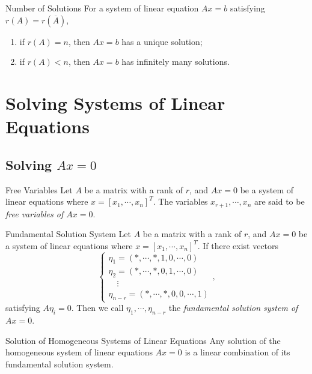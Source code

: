 \begin{proposition}{Number of Solutions}{}
  For a system of linear equation $Ax = b$ satisfying $r(A) = r(\overline{A})$,
  \begin{enumerate}
  \item if $r(A) = n$, then $Ax = b$ has a unique solution;
  \item if $r(A) < n$, then $Ax = b$ has infinitely many solutions.
  \end{enumerate}
\end{proposition}


\section{Solving Systems of Linear Equations}

\subsection{Solving $Ax = 0$}

\begin{definition}{Free Variables}{}
  Let $A$ be a matrix with a rank of $r$,
  and $Ax = 0$ be a system of linear equations where $x = [x_1,\cdots,x_n]^T$.
  The variables $x_{r+1},\cdots,x_n$ are said to be \emph{free variables of $Ax = 0$}.
\end{definition}

\begin{definition}{Fundamental Solution System}{}
  Let $A$ be a matrix with a rank of $r$,
  and $Ax = 0$ be a system of linear equations where $x = [x_1,\cdots,x_n]^T$.
  If there exist vectors
  \begin{equation}
    \begin{cases}
      \eta_1 = (*,\cdots,*,1,0,\cdots,0)\\
      \eta_2 = (*,\cdots,*,0,1,\cdots,0)\\
      \quad \vdots\\
      \eta_{n-r} = (*,\cdots,*,0,0,\cdots,1)
    \end{cases},
  \end{equation}
  satisfying $A\eta_i = 0$.
  Then we call $\eta_1,\cdots,\eta_{n-r}$ the \emph{fundamental solution system of
    $Ax = 0$}.
\end{definition}

\begin{proposition}{Solution of Homogeneous Systems of Linear Equations}{}
  Any solution of the homogeneous system of linear equations $Ax = 0$ is
  a linear combination of its fundamental solution system.
\end{proposition}

